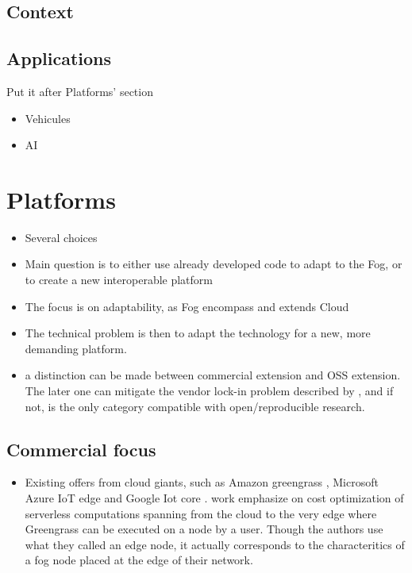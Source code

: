 \documentclass[11pt]{sdm}
\begin{document}
\subsection {Context}
\subsection {Applications}
Put it after Platforms' section
\begin{itemize}
    \item Vehicules
    \item \gls{AI}
\end{itemize}

\section{Platforms}
\begin{itemize}
    \item Several choices
    \item Main question is to either use already developed code to adapt to the Fog, or to create a new interoperable platform
    \item The focus is on adaptability, as Fog encompass and extends Cloud
    \item The technical problem is then to adapt the technology for a new, more demanding platform.
    \item a distinction can be made between commercial extension and \gls{OSS} extension. The later one can mitigate the vendor lock-in problem described by \citet{kjorveziroski_iot_2021}, and if not, is the only category compatible with open/reproducible research.
\end{itemize}

\subsection{Commercial focus}
\begin{itemize}
    \item Existing offers from cloud giants, such as Amazon greengrass \cite{noauthor_aws_nodate}, Microsoft Azure IoT edge \cite{noauthor_iot_nodate} and Google Iot core \cite{noauthor_cloud_nodate}.  work emphasize on cost optimization of serverless computations spanning from the cloud to the very edge where Greengrass can be executed on a node by a user. Though the authors use what they called an edge node, it actually corresponds to the characteritics of a fog node placed at the edge of their network.
    
\end{itemize}
\end{document}
